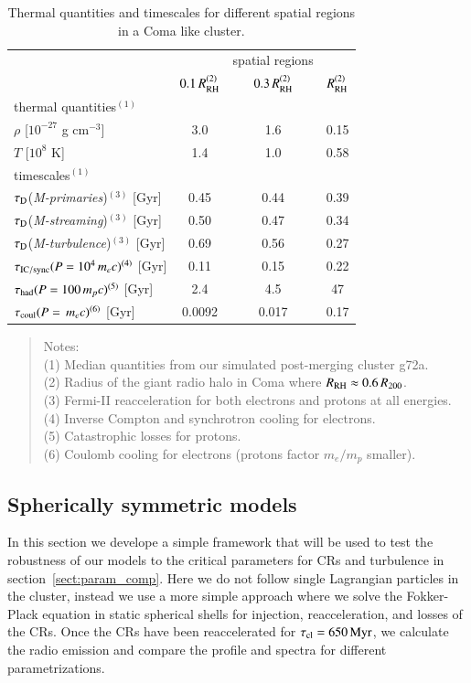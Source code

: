 \documentclass[a4paper,fleqn,usenatbib]{mnras}
\newcommand{\Mstream}{{\it M-streaming}\xspace}
\newcommand{\Mflatturb}{{\it M-turbulence}\xspace}
\newcommand{\Mprimary}{{\it M-primaries}\xspace}
\newcommand{\RH}{R_\rmn{RH}}
\begin{document}
\begin{table}
  \caption{Thermal quantities and timescales for different spatial
    regions in a Coma like cluster.}
\begin{tabular}{l c  c c}
\hline
\hline
& & spatial regions & \\
 & $0.1\,\RH^{(2)}$ & $0.3\,\RH^{(2)}$ & $\RH^{(2)}$   \\
\hline
thermal quantities$^{(1)}$ & & & \\
$\rho$ [$10^{-27}$ g cm$^{-3}$] & 3.0 & 1.6 & 0.15 \\
$T$ [$10^{8}$ K] & 1.4 & 1.0 & 0.58 \\
\hline
timescales$^{(1)}$ & & & \\
$\tau_{\mathrm{D}}$(\Mprimary)$^{(3)}$ [Gyr] & 0.45 & 0.44 & 0.39 \\
$\tau_{\mathrm{D}}$(\Mstream)$^{(3)}$  [Gyr] & 0.50 & 0.47 & 0.34 \\
$\tau_{\mathrm{D}}$(\Mflatturb)$^{(3)}$  [Gyr] & 0.69 & 0.56 & 0.27 \\
$\tau_{\mathrm{IC/sync}}(P=10^4\,m_ec)^{(4)}$ [Gyr] & 0.11 & 0.15 & 0.22 \\
$\tau_{\mathrm{had}}(P=100\,m_pc)^{(5)}$ [Gyr] & 2.4 & 4.5 & 47 \\
$\tau_{\mathrm{coul}}(P=\,m_ec)^{(6)}$  [Gyr] & 0.0092 & 0.017 & 0.17 \\
\hline
\end{tabular}
\begin{quote}
 Notes: \\ 
 (1) Median quantities from our simulated post-merging cluster g72a.\\
 (2) Radius of the giant radio halo in Coma where $\RH\approx0.6\,R_{200}$.\\
 (3) Fermi-II reacceleration for both electrons and protons at all energies.\\
 (4) Inverse Compton and synchrotron cooling for electrons.\\
 (5) Catastrophic losses for protons.\\
 (6) Coulomb cooling for electrons (protons factor $m_e/m_p$ smaller).\\

 \label{tab:timescales}
  \end{quote}
\end{table} 


\subsection{Spherically symmetric models}
In this section we develope a simple framework that will be used to
test the robustness of our models to the critical parameters for CRs
and turbulence in section~\ref{sect:param_comp}. Here we do not follow
single Lagrangian particles in the cluster, instead we use a more
simple approach where we solve the Fokker-Plack equation in static
spherical shells for injection, reacceleration, and losses of the
CRs. Once the CRs have been reaccelerated for $\tau_{\mathrm{cl}} =
650\,{\mathrm{Myr}}$, we calculate the radio emission and compare the
profile and spectra for different parametrizations.
\end{document}
